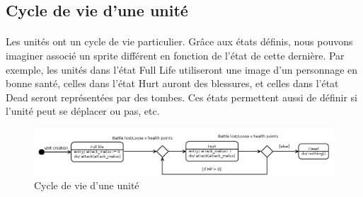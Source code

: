 \subsection{Cycle de vie d'une unité}

\paragraph{}
Les unités ont un cycle de vie particulier. Grâce aux états définis, nous pouvons imaginer associé un sprite différent en fonction de l'état de cette dernière. Par exemple, les unités dans l'état \og{} Full Life \fg{} utiliseront une image d'un personnage en bonne santé, celles dans l'état \og{} Hurt \fg{}  auront des blessures, et celles dans l'état \og{} Dead \fg{}  seront représentées par des tombes. Ces états permettent aussi de définir si l'unité peut se déplacer ou pas, etc.

\begin{figure}[!h]
  \centering
  \includegraphics[width=13cm]{schemas/state-diagram.png}
  \caption{Cycle de vie d'une unité}
  \label{state-diagram}
\end{figure}



